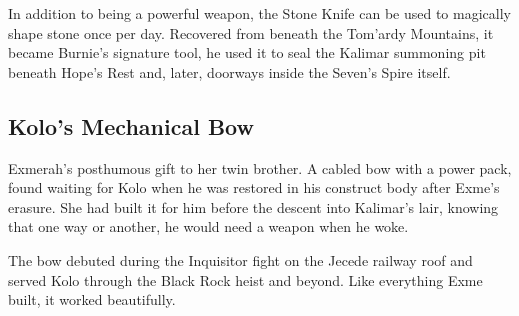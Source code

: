 In addition to being a powerful weapon, the Stone Knife can be used to magically shape stone once per day. Recovered from beneath the Tom'ardy Mountains, it became Burnie's signature tool, he used it to seal the Kalimar summoning pit beneath Hope's Rest and, later, doorways inside the Seven's Spire itself.

\smallskip

\subsection*{Kolo's Mechanical Bow}

\noindent

Exmerah's posthumous gift to her twin brother.  A cabled bow with a power pack, found waiting for Kolo when he was restored in his construct body after Exme's erasure.  She had built it for him before the descent into Kalimar's lair, knowing that one way or another, he would need a weapon when he woke.

The bow debuted during the Inquisitor fight on the Jecede railway roof and served Kolo through the Black Rock heist and beyond.  Like everything Exme built, it worked beautifully.

\smallskip








\clearpage